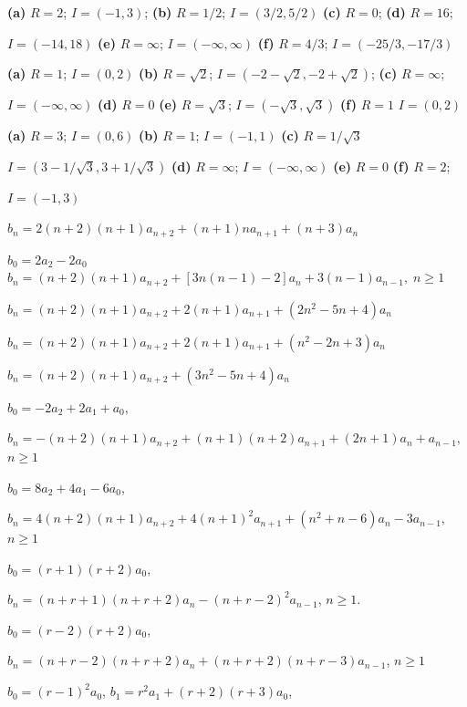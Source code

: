 \medskip

{\bf (a)} $R=2$;   $I=(-1,3)$;   {\bf (b)} $R=1/2$;   $I=(3/2,5/2)$
{\bf (c)}  $R=0$;   {\bf (d)} $R=16$;

\quad\;  \;  $I=(-14,18)$
{\bf (e)} $R=\infty$;   $I=(-\infty,\infty)$ {\bf (f)} $R=4/3$;
$I=(-25/3,-17/3)$

{\bf (a)} $R=1$;   $I=(0,2)$   {\bf (b)} $R=\sqrt{2}$;
$I=(-2-\sqrt{2},-2+\sqrt{2})$; {\bf (c)} $R=\infty$;

\quad\;  \;  $I=(-\infty,\infty)$ {\bf (d)} $R=0$ {\bf (e)} $R=\sqrt{3}$;
$I=(-\sqrt{3},\sqrt{3})$ {\bf (f)} $R=1$   $I=(0,2)$

{\bf (a)} $R=3$;   $I=(0,6)$   {\bf (b)} $R=1$;   $I=(-1,1)$
{\bf (c)} $R=1/\sqrt{3}$

\quad\;  \;  $I=(3-1/\sqrt{3},3+1/\sqrt{3})$   {\bf (d)}
$R=\infty$;
$I=(-\infty,\infty)$ {\bf (e)} $R=0$   {\bf (f)} $R=2$;

\quad\;  \;   $I=(-1,3)$

$b_{n}=2(n+2)(n+1)a_{n+2}+(n+1)na_{n+1}+(n+3)a_{n}$

$b_{0}=2a_{2}-2a_{0}$
$b_{n}=(n+2)(n+1)a_{n+2}+[3n(n-1)-2]a_{n}+3(n-1)a_{n-1},\;n\ge1$

$b_{n}=(n+2)(n+1)a_{n+2}+2(n+1)a_{n+1}+(2n^{2}-5n+4)a_{n}$

$b_{n}=(n+2)(n+1)a_{n+2}+2(n+1)a_{n+1}+(n^{2}-2n+3)a_{n}$

$b_{n}=(n+2)(n+1)a_{n+2}+(3n^{2}-5n+4)a_{n}$

$b_{0}=-2a_{2}+2a_{1}+a_{0}$,

\quad\;  \;
$b_{n}=-(n+2)(n+1)a_{n+2}+(n+1)(n+2)a_{n+1}+(2n+1)a_{n}
+a_{n-1}$,\;   $n\ge1$

$b_{0}=8a_{2}+4a_{1}-6a_{0}$,

\quad\;  \;
$b_{n}=4(n+2)(n+1)a_{n+2}+4(n+1)^{2}a_{n+1}+(n^{2}+n-6)a_{n}-3a_{n-1}$,\;
$n\ge1$

$b_{0}=(r+1)(r+2)a_{0}$,\;

\quad\;  \;
$b_{n}=(n+r+1)(n+r+2)a_{n}-(n+r-2)^{2}a_{n-1}$,\;       $n\ge1$.

$b_{0}=(r-2)(r+2)a_{0}$,\;

\quad\;  \;
$b_{n}=(n+r-2)(n+r+2)a_{n}+(n+r+2)(n+r-3)a_{n-1}$,\;       $n\ge1$

$b_{0}=(r-1)^{2}a_{0}$,\;
$b_{1}=r^{2}a_{1}+(r+2)(r+3)a_{0}$,

